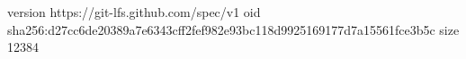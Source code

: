 version https://git-lfs.github.com/spec/v1
oid sha256:d27cc6de20389a7e6343cff2fef982e93bc118d9925169177d7a15561fce3b5c
size 12384
